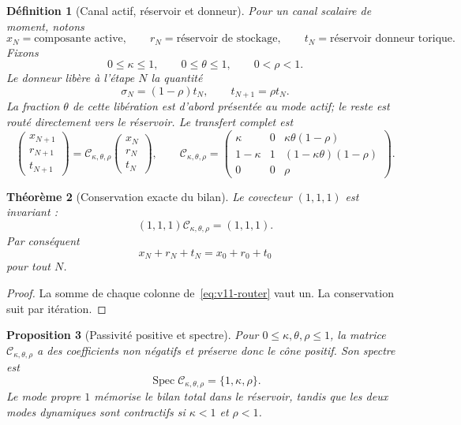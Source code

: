 \documentclass[11pt,a4paper]{article}
\newtheorem{theorem}{Théorème}[section]
\newtheorem{proposition}[theorem]{Proposition}
\newtheorem{definition}[theorem]{Définition}
\begin{document}
\begin{definition}[Canal actif, réservoir et donneur]\label{def:v11-three-port}
Pour un canal scalaire de moment, notons
\[
 x_N=\text{composante active},\qquad
 r_N=\text{réservoir de stockage},\qquad
 t_N=\text{réservoir donneur torique}.
\]
Fixons
\[
 0\le\kappa\le1,\qquad
 0\le\theta\le1,\qquad
 0<\rho<1.
\]
Le donneur libère à l'étape $N$ la quantité
\[
 \sigma_N=(1-\rho)t_N,
 \qquad
 t_{N+1}=\rho t_N.
\]
La fraction $\theta$ de cette libération est d'abord présentée au mode actif; le reste est routé directement vers le réservoir. Le transfert complet est
\begin{equation}\label{eq:v11-router}
 \boxed{
 \begin{pmatrix}
 x_{N+1}\\ r_{N+1}\\ t_{N+1}
 \end{pmatrix}
 =
 \mathcal C_{\kappa,\theta,\rho}
 \begin{pmatrix}
 x_N\\ r_N\\ t_N
 \end{pmatrix},
 \qquad
 \mathcal C_{\kappa,\theta,\rho}
 =
 \begin{pmatrix}
 \kappa&0&\kappa\theta(1-\rho)\\
 1-\kappa&1&(1-\kappa\theta)(1-\rho)\\
 0&0&\rho
 \end{pmatrix}.}
\end{equation}
\end{definition}

\begin{theorem}[Conservation exacte du bilan]\label{thm:v11-conservation}
Le covecteur $(1,1,1)$ est invariant :
\[
 \boxed{(1,1,1)\mathcal C_{\kappa,\theta,\rho}=(1,1,1).}
\]
Par conséquent
\[
 \boxed{x_N+r_N+t_N=x_0+r_0+t_0}
\]
pour tout $N$.
\end{theorem}

\begin{proof}
La somme de chaque colonne de~\eqref{eq:v11-router} vaut un. La conservation suit par itération.
\end{proof}

\begin{proposition}[Passivité positive et spectre]\label{prop:v11-passive-spectrum}
Pour $0\le\kappa,\theta,\rho\le1$, la matrice $\mathcal C_{\kappa,\theta,\rho}$ a des coefficients non négatifs et préserve donc le cône positif. Son spectre est
\[
 \boxed{\operatorname{Spec}\mathcal C_{\kappa,\theta,\rho}
 =\{1,\kappa,\rho\}.}
\]
Le mode propre $1$ mémorise le bilan total dans le réservoir, tandis que les deux modes dynamiques sont contractifs si $\kappa<1$ et $\rho<1$.
\end{proposition}
\end{document}
